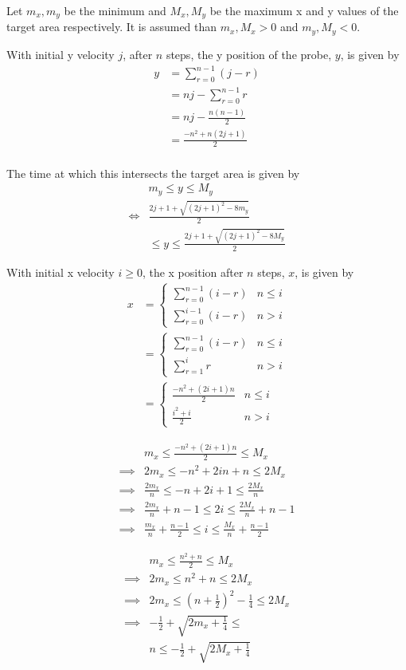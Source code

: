 \documentclass{article}
\begin{document}
Let \(m_x, m_y\) be the minimum and \(M_x, M_y\) be the maximum x and y values of the target area respectively.
It is assumed than \(m_x, M_x > 0\) and \(m_y, M_y < 0\).

With initial y velocity \(j\), after \(n\) steps, the y position of the probe, \(y\), is given by
\begin{align*}
  y &= \sum_{r=0}^{n-1}(j - r) \\
  &= nj - \sum_{r=0}^{n-1}{r} \\
  &= nj - \frac{n(n-1)}{2} \\
  &= \frac{-n^2 + n(2j + 1)}{2} \\
\end{align*}

The time at which this intersects the target area is given by
\begin{align*}
  & m_y \le y \le M_y \\
  \iff & \frac{2j + 1 + \sqrt{(2j + 1)^2 - 8m_y}}{2} \\
  & \le y \le \frac{2j + 1 + \sqrt{(2j + 1)^2 - 8M_y}}{2}
\end{align*}

With initial x velocity \(i \ge 0\), the x position after \(n\) steps, \(x\), is given by
\begin{align*}
  x &=
  \begin{cases}
    \sum_{r=0}^{n-1}(i - r) & n \le i \\
    \sum_{r=0}^{i-1}(i - r) & n > i
  \end{cases} \\
  &=
  \begin{cases}
    \sum_{r=0}^{n-1}(i - r) & n \le i \\
    \sum_{r=1}^{i}r & n > i
  \end{cases} \\
  &=
  \begin{cases}
    \frac{-n^2 + (2i + 1)n}{2} & n \le i \\
    \frac{i^2 + i}{2} & n > i
  \end{cases}
\end{align*}

\begin{align*}
  & m_x \le \frac{-n^2 + (2i + 1)n}{2} \le M_x \\
  \implies & 2m_x \le -n^2 + 2in + n \le 2M_x \\
  \implies & \frac{2m_x}{n} \le -n + 2i + 1 \le \frac{2M_x}{n} \\
  \implies & \frac{2m_x}{n} + n - 1 \le 2i \le \frac{2M_x}{n} + n - 1 \\
  \implies & \frac{m_x}{n} + \frac{n - 1}{2} \le i \le \frac{M_x}{n} + \frac{n - 1}{2}
\end{align*}

\begin{align*}
  & m_x \le \frac{n^2 + n}{2} \le M_x \\
  \implies & 2m_x \le n^2 + n \le 2M_x \\
  \implies & 2m_x \le (n + \frac{1}{2})^2 - \frac{1}{4} \le 2M_x \\
  \implies & -\frac{1}{2} + \sqrt{2m_x + \frac{1}{4}} \le \\
  & n \le -\frac{1}{2} + \sqrt{2M_x + \frac{1}{4}}
\end{align*}
\end{document}
